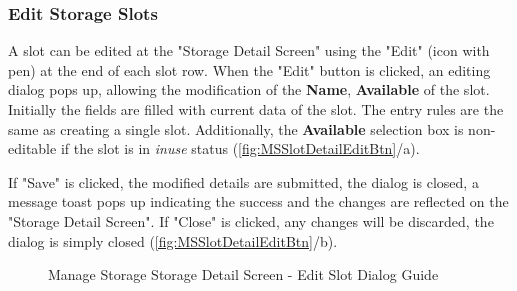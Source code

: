 \subsubsection{Edit Storage Slots}
\label{subsubsec:editSlot}
A slot can be edited at the "Storage Detail Screen" using the "Edit" (icon with pen) at the end of each slot row. 
When the "Edit" button is clicked, an editing dialog pops up, allowing the modification of the \textbf{Name}, \textbf{Available} of the slot. Initially the fields are filled with current data of the slot. The entry rules are the same as creating a single slot. Additionally, the \textbf{Available} selection box is non-editable if the slot is in \textit{inuse} status (\autoref{fig:MSSlotDetailEditBtn}/a).

If "Save" is clicked, the modified details are submitted, the dialog is closed, a message toast pops up indicating the success and the changes are reflected on the "Storage Detail Screen". If "Close" is clicked, any changes will be discarded, the dialog is simply closed (\autoref{fig:MSSlotDetailEditBtn}/b).

\begin{figure}[htb!]
	\centering
    \vspace{5pt}
    \vspace{10pt}
    
    \caption{Manage Storage Storage Detail Screen - Edit Slot Dialog Guide}
	\label{fig:MSSlotDetailEditBtn}
\end{figure}

